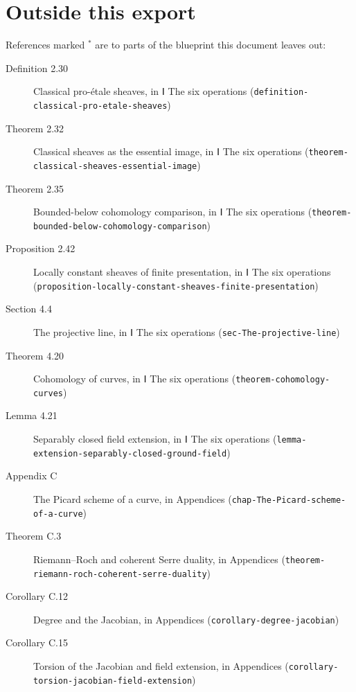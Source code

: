 \documentclass[11pt]{article}
\newcommand{\bpslug}[1]{\texttt{#1}}
\begin{document}
\clearpage{}\hypertarget{bp-outside}{}%
\section*{Outside this export}
References marked \ensuremath{{}^\ast} are to parts of the blueprint this document leaves out:
\begin{description}
\item[Definition 2.30] Classical pro-étale sheaves, in Ⅰ The six operations (\bpslug{definition-{}\allowbreak{}classical-{}\allowbreak{}pro-{}\allowbreak{}etale-{}\allowbreak{}sheaves})
\item[Theorem 2.32] Classical sheaves as the essential image, in Ⅰ The six operations (\bpslug{theorem-{}\allowbreak{}classical-{}\allowbreak{}sheaves-{}\allowbreak{}essential-{}\allowbreak{}image})
\item[Theorem 2.35] Bounded-below cohomology comparison, in Ⅰ The six operations (\bpslug{theorem-{}\allowbreak{}bounded-{}\allowbreak{}below-{}\allowbreak{}cohomology-{}\allowbreak{}comparison})
\item[Proposition 2.42] Locally constant sheaves of finite presentation, in Ⅰ The six operations (\bpslug{proposition-{}\allowbreak{}locally-{}\allowbreak{}constant-{}\allowbreak{}sheaves-{}\allowbreak{}finite-{}\allowbreak{}presentation})
\item[Section 4.4] The projective line, in Ⅰ The six operations (\bpslug{sec-{}\allowbreak{}The-{}\allowbreak{}projective-{}\allowbreak{}line})
\item[Theorem 4.20] Cohomology of curves, in Ⅰ The six operations (\bpslug{theorem-{}\allowbreak{}cohomology-{}\allowbreak{}curves})
\item[Lemma 4.21] Separably closed field extension, in Ⅰ The six operations (\bpslug{lemma-{}\allowbreak{}extension-{}\allowbreak{}separably-{}\allowbreak{}closed-{}\allowbreak{}ground-{}\allowbreak{}field})
\item[Appendix C] The Picard scheme of a curve, in Appendices (\bpslug{chap-{}\allowbreak{}The-{}\allowbreak{}Picard-{}\allowbreak{}scheme-{}\allowbreak{}of-{}\allowbreak{}a-{}\allowbreak{}curve})
\item[Theorem C.3] Riemann–Roch and coherent Serre duality, in Appendices (\bpslug{theorem-{}\allowbreak{}riemann-{}\allowbreak{}roch-{}\allowbreak{}coherent-{}\allowbreak{}serre-{}\allowbreak{}duality})
\item[Corollary C.12] Degree and the Jacobian, in Appendices (\bpslug{corollary-{}\allowbreak{}degree-{}\allowbreak{}jacobian})
\item[Corollary C.15] Torsion of the Jacobian and field extension, in Appendices (\bpslug{corollary-{}\allowbreak{}torsion-{}\allowbreak{}jacobian-{}\allowbreak{}field-{}\allowbreak{}extension})
\end{description}
\clearpage{}%
\end{document}
